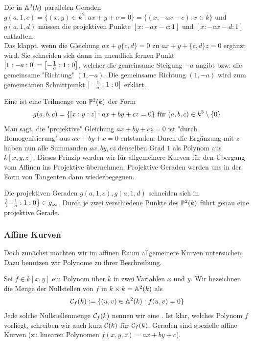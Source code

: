 Die in $\mathbb{A}^2(k)$ parallelen Geraden $g(a,1,c) = \{(x,y) \in k^2 : ax + y + c = 0\} = \{(x,-ax-c) : x \in k\}$ und $g(a,1,d)$ müssen die projektiven Punkte $[x:-ax-c:1]$ und $[x:-ax-d:1]$ enthalten. \\
Das klappt, wenn die Gleichung $ax + y \{c,d\} = 0$ zu $ax + y + \{c,d\}z = 0$ ergänzt wird. 
Sie schneiden sich dann im unendlich fernen Punkt $[1 : -a : 0] = \left\lbrack-\frac{1}{a} : 1 : 0\right\rbrack$, welcher die gemeinsame Steigung $-a$ angibt bzw. die gemeinsame "Richtung" $(1,-a)$. 
Die gemeinsame Richtung $(1,-a)$ wird zum gemeinsamen Schnittpunkt $\left\lbrack-\frac{1}{a} : 1 : 0\right\rbrack$ erklärt.

\begin{defn}
	Eine  ist eine Teilmenge von $\mathbb{P}^2(k)$ der Form
	\[ g(a,b,c) = \{ [x:y:z] : ax+by+cz = 0\} \text{ für } (a,b,c) \in k^3 \setminus \{0\} \]
	Man sagt, die "projektive" Gleichung $ax+by+cz = 0$ ist "durch Homogenisierung" aus $ax+by+c = 0$ entstanden: Durch die Ergänzung mit $z$ haben nun alle Summanden $ax,by,cz$ denselben Grad $1$ als Polynom aus $k[x,y,z]$. 
	Dieses Prinzip werden wir für allgemeinere Kurven für den Übergang vom Affinen ins Projektive übernehmen. 
	Projektive Geraden werden uns in der Form von Tangenten dann wiederbegegnen.
\end{defn}

	Die projektiven Geraden $g(a,1,c),g(a,1,d)$ schneiden sich in $\left\{-\frac{1}{a}:1:0\right\} \in g_\infty$. 
	Durch je zwei verschiedene Punkte des $\mathbb{P}^2(k)$ führt genau eine projektive Gerade.
	
\subsubsection{Affine Kurven}
\label{subsub:2.2.2}
	Doch zunächst möchten wir im affinen Raum allgemeinere Kurven untersuchen. 
	Dazu benutzen wir Polynome zu ihrer Beschreibung.
	
\begin{defn}
	Sei $f \in k[x,y]$ ein Polynom über $k$ in zwei Variablen $x$ und $y$. 
	Wir bezeichnen die Menge der Nullstellen von $f$ in $k \times k = \mathbb{A}^2(k)$ als
	\[ \mathcal{C}_f(k) := \{(u,v) \in \mathbb{A}^2(k) : f(u,v) = 0\}\]
	Jede solche Nullstellenmenge $\mathcal{C}_f(k)$ nennen wir eine . 
	Ist klar, welches Polynom $f$ vorliegt, schreiben wir auch kurz $\mathcal{C}(k)$ für $\mathcal{C}_f(k)$. 
	Geraden sind spezielle affine Kurven (zu linearen Polynomen $f(x,y,z) = ax+by+c$).
\end{defn}

